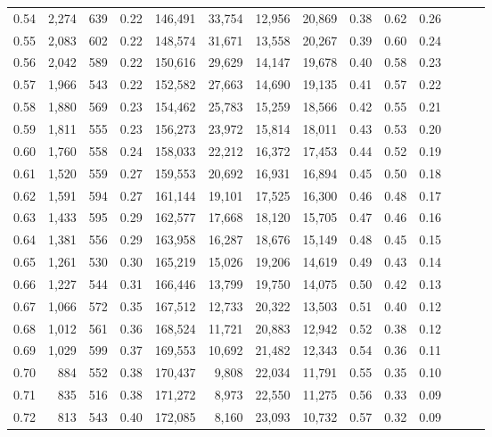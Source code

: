 \begin{tabular}{rrrrrrrrrrrrrr}
0.54 &  2,274 &  639 &  0.22 &  146,491 &   33,754 &  12,956 &  20,869 &  0.38 &  0.62 &      0.26 \\
0.55 &  2,083 &  602 &  0.22 &  148,574 &   31,671 &  13,558 &  20,267 &  0.39 &  0.60 &      0.24 \\
0.56 &  2,042 &  589 &  0.22 &  150,616 &   29,629 &  14,147 &  19,678 &  0.40 &  0.58 &      0.23 \\
0.57 &  1,966 &  543 &  0.22 &  152,582 &   27,663 &  14,690 &  19,135 &  0.41 &  0.57 &      0.22 \\
0.58 &  1,880 &  569 &  0.23 &  154,462 &   25,783 &  15,259 &  18,566 &  0.42 &  0.55 &      0.21 \\
0.59 &  1,811 &  555 &  0.23 &  156,273 &   23,972 &  15,814 &  18,011 &  0.43 &  0.53 &      0.20 \\
0.60 &  1,760 &  558 &  0.24 &  158,033 &   22,212 &  16,372 &  17,453 &  0.44 &  0.52 &      0.19 \\
0.61 &  1,520 &  559 &  0.27 &  159,553 &   20,692 &  16,931 &  16,894 &  0.45 &  0.50 &      0.18 \\
0.62 &  1,591 &  594 &  0.27 &  161,144 &   19,101 &  17,525 &  16,300 &  0.46 &  0.48 &      0.17 \\
0.63 &  1,433 &  595 &  0.29 &  162,577 &   17,668 &  18,120 &  15,705 &  0.47 &  0.46 &      0.16 \\
0.64 &  1,381 &  556 &  0.29 &  163,958 &   16,287 &  18,676 &  15,149 &  0.48 &  0.45 &      0.15 \\
0.65 &  1,261 &  530 &  0.30 &  165,219 &   15,026 &  19,206 &  14,619 &  0.49 &  0.43 &      0.14 \\
0.66 &  1,227 &  544 &  0.31 &  166,446 &   13,799 &  19,750 &  14,075 &  0.50 &  0.42 &      0.13 \\
0.67 &  1,066 &  572 &  0.35 &  167,512 &   12,733 &  20,322 &  13,503 &  0.51 &  0.40 &      0.12 \\
0.68 &  1,012 &  561 &  0.36 &  168,524 &   11,721 &  20,883 &  12,942 &  0.52 &  0.38 &      0.12 \\
0.69 &  1,029 &  599 &  0.37 &  169,553 &   10,692 &  21,482 &  12,343 &  0.54 &  0.36 &      0.11 \\
0.70 &    884 &  552 &  0.38 &  170,437 &    9,808 &  22,034 &  11,791 &  0.55 &  0.35 &      0.10 \\
0.71 &    835 &  516 &  0.38 &  171,272 &    8,973 &  22,550 &  11,275 &  0.56 &  0.33 &      0.09 \\
0.72 &    813 &  543 &  0.40 &  172,085 &    8,160 &  23,093 &  10,732 &  0.57 &  0.32 &      0.09 \\

\end{tabular}
